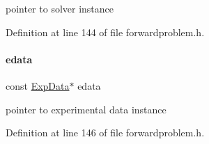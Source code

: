 pointer to solver instance 

Definition at line 144 of file forwardproblem.\+h.

\mbox{\label{classamici_1_1_forward_problem_a9ec6aee8cd7c91d0e49aed6e3d0db4ce}} 
\paragraph{\texorpdfstring{edata}{edata}}
{\footnotesize\ttfamily const \mbox{\hyperlink{classamici_1_1_exp_data}{Exp\+Data}}$\ast$ edata}

pointer to experimental data instance 

Definition at line 146 of file forwardproblem.\+h.

